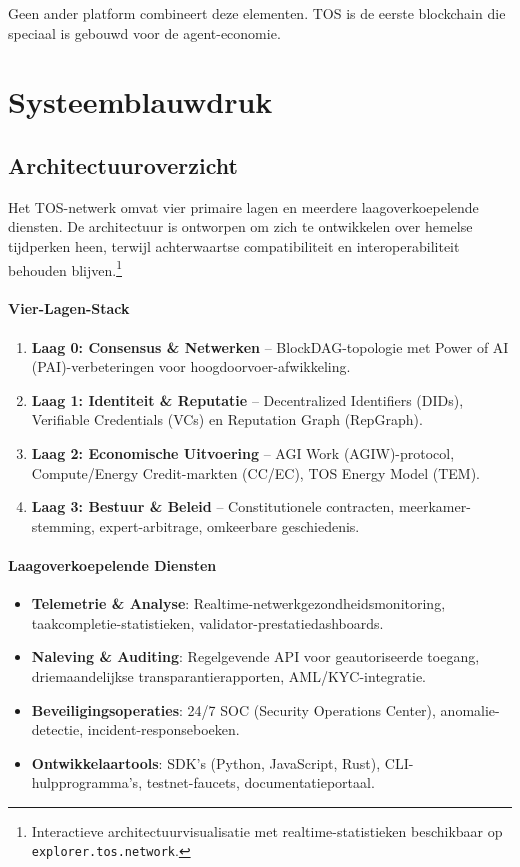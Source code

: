 \documentclass[11pt]{article}
\begin{document}
Geen ander platform combineert deze elementen. TOS is de eerste blockchain die speciaal is gebouwd voor de agent-economie.

\section{Systeemblauwdruk}
\subsection{Architectuuroverzicht}
Het TOS-netwerk omvat vier primaire lagen en meerdere laagoverkoepelende diensten. De architectuur is ontworpen om zich te ontwikkelen over hemelse tijdperken heen, terwijl achterwaartse compatibiliteit en interoperabiliteit behouden blijven.\footnote{Interactieve architectuurvisualisatie met realtime-statistieken beschikbaar op \texttt{explorer.tos.network}.}

\paragraph{Vier-Lagen-Stack}
\begin{enumerate}[noitemsep]
  \item \textbf{Laag 0: Consensus \& Netwerken} -- BlockDAG-topologie met Power of AI (PAI)-verbeteringen voor hoogdoorvoer-afwikkeling.
  \item \textbf{Laag 1: Identiteit \& Reputatie} -- Decentralized Identifiers (DIDs), Verifiable Credentials (VCs) en Reputation Graph (RepGraph).
  \item \textbf{Laag 2: Economische Uitvoering} -- AGI Work (AGIW)-protocol, Compute/Energy Credit-markten (CC/EC), TOS Energy Model (TEM).
  \item \textbf{Laag 3: Bestuur \& Beleid} -- Constitutionele contracten, meerkamer-stemming, expert-arbitrage, omkeerbare geschiedenis.
\end{enumerate}

\paragraph{Laagoverkoepelende Diensten}
\begin{itemize}[noitemsep]
  \item \textbf{Telemetrie \& Analyse}: Realtime-netwerkgezondheidsmonitoring, taakcompletie-statistieken, validator-prestatiedashboards.
  \item \textbf{Naleving \& Auditing}: Regelgevende API voor geautoriseerde toegang, driemaandelijkse transparantierapporten, AML/KYC-integratie.
  \item \textbf{Beveiligingsoperaties}: 24/7 SOC (Security Operations Center), anomalie-detectie, incident-responseboeken.
  \item \textbf{Ontwikkelaartools}: SDK's (Python, JavaScript, Rust), CLI-hulpprogramma's, testnet-faucets, documentatieportaal.
\end{itemize}
\end{document}
